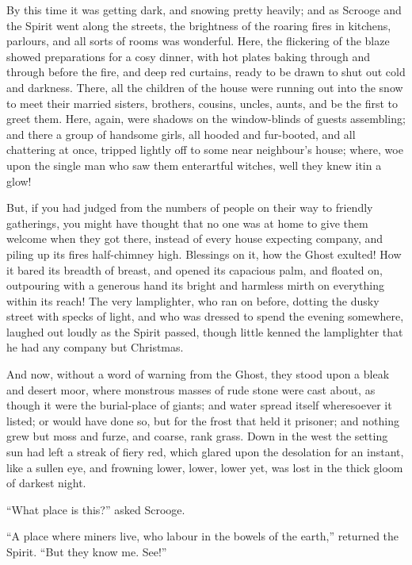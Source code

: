 \documentclass[paper=5.5in:8.5in,BCOR=7mm,twoside,DIV=calc,12pt,usegeometry]{scrbook} %
\begin{document}
By this time it was getting dark, and snowing pretty heavily; and as Scrooge and the Spirit went along the streets, the brightness of the roaring fires in kitchens, parlours, and all sorts of rooms was wonderful. Here, the flickering of the blaze showed preparations for a cosy dinner, with hot plates baking through and through before the fire, and deep red curtains, ready to be drawn to shut out cold and darkness. There, all the children of the house were running out into the snow to meet their married sisters, brothers, cousins, uncles, aunts, and be the first to greet them. Here, again, were shadows on the window-blinds of guests assembling; and there a group of handsome girls, all hooded and fur-booted, and all chattering at once, tripped lightly off to some near neighbour's house; where, woe upon the single man who saw them enter\textemdash artful witches, well they knew it\textemdash in a glow!

But, if you had judged from the numbers of people on their way to friendly gatherings, you might have thought that no one was at home to give them welcome when they got there, instead of every house expecting company, and piling up its fires half-chimney high. Blessings on it, how the Ghost exulted! How it bared its breadth of breast, and opened its capacious palm, and floated on, outpouring with a generous hand its bright and harmless mirth on everything within its reach! The very lamplighter, who ran on before, dotting the dusky street with specks of light, and who was dressed to spend the evening somewhere, laughed out loudly as the Spirit passed, though little kenned the lamplighter that he had any company but Christmas.

And now, without a word of warning from the Ghost, they stood upon a bleak and desert moor, where monstrous masses of rude stone were cast about, as though it were the burial-place of giants; and water spread itself wheresoever it listed; or would have done so, but for the frost that held it prisoner; and nothing grew but moss and furze, and coarse, rank grass. Down in the west the setting sun had left a streak of fiery red, which glared upon the desolation for an instant, like a sullen eye, and frowning lower, lower, lower yet, was lost in the thick gloom of darkest night.

\enquote{What place is this?} asked Scrooge.

\enquote{A place where miners live, who labour in the bowels of the earth,} returned the Spirit. \enquote{But they know me. See!}
\end{document}
